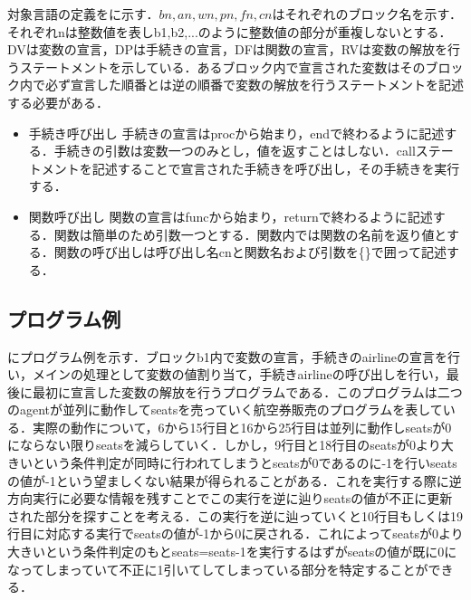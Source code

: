 \documentclass[submit,PRO]{ipsj}
\begin{document}
対象言語の定義をに示す．$bn,an,wn,pn,fn,cn$はそれぞれのブロック名を示す．それぞれnは整数値を表しb1,b2,...のように整数値の部分が重複しないとする．DVは変数の宣言，DPは手続きの宣言，DFは関数の宣言，RVは変数の解放を行うステートメントを示している．あるブロック内で宣言された変数はそのブロック内で必ず宣言した順番とは逆の順番で変数の解放を行うステートメントを記述する必要がある．

\begin{itemize}
\item
手続き呼び出し  手続きの宣言はprocから始まり，endで終わるように記述する．手続きの引数は変数一つのみとし，値を返すことはしない．callステートメントを記述することで宣言された手続きを呼び出し，その手続きを実行する．
\item
関数呼び出し  関数の宣言はfuncから始まり，returnで終わるように記述する．関数は簡単のため引数一つとする．関数内では関数の名前を返り値とする．関数の呼び出しは呼び出し名cnと関数名および引数を\{\}で囲って記述する．
\end{itemize}

\subsection{プログラム例}
にプログラム例を示す．ブロックb1内で変数の宣言，手続きのairlineの宣言を行い，メインの処理として変数の値割り当て，手続きairlineの呼び出しを行い，最後に最初に宣言した変数の解放を行うプログラムである．このプログラムは二つのagentが並列に動作してseatsを売っていく航空券販売のプログラムを表している．実際の動作について，6から15行目と16から25行目は並列に動作しseatsが0にならない限りseatsを減らしていく．しかし，9行目と18行目のseatsが0より大きいという条件判定が同時に行われてしまうとseatsが0であるのに-1を行いseatsの値が-1という望ましくない結果が得られることがある．これを実行する際に逆方向実行に必要な情報を残すことでこの実行を逆に辿りseatsの値が不正に更新された部分を探すことを考える．この実行を逆に辿っていくと10行目もしくは19行目に対応する実行でseatsの値が-1から0に戻される．これによってseatsが0より大きいという条件判定のもとseats=seats-1を実行するはずがseatsの値が既に0になってしまっていて不正に1引いてしてしまっている部分を特定することができる．
\end{document}
